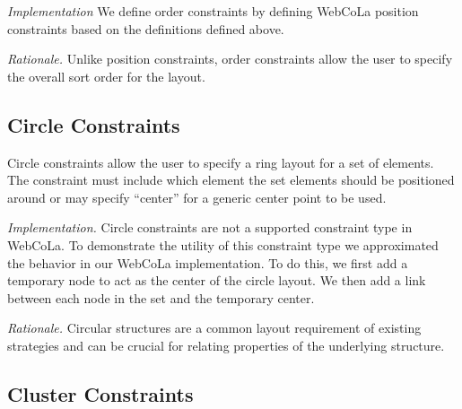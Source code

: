 \emph{Implementation}
We define order constraints by defining WebCoLa position constraints based
on the definitions defined above. 


\emph{Rationale.} Unlike position constraints, order constraints allow the
user to specify the overall sort order for the layout.

\subsection{Circle Constraints}

Circle constraints allow the user to specify a ring layout for a set of
elements. The constraint must include which element the set elements should
be positioned around or may specify ``center'' for a generic center point
to be used.



\emph{Implementation.}
Circle constraints are not a supported constraint type in WebCoLa. To 
demonstrate the utility of this constraint type we approximated the behavior
in our WebCoLa implementation. To do this, we first add a temporary node
to act as the center of the circle layout. We then add a link between each 
node in the set and the temporary center. 


\emph{Rationale.} Circular structures are a common layout requirement of
existing strategies  and can be crucial for relating
properties of the underlying structure.

\subsection{Cluster Constraints}

